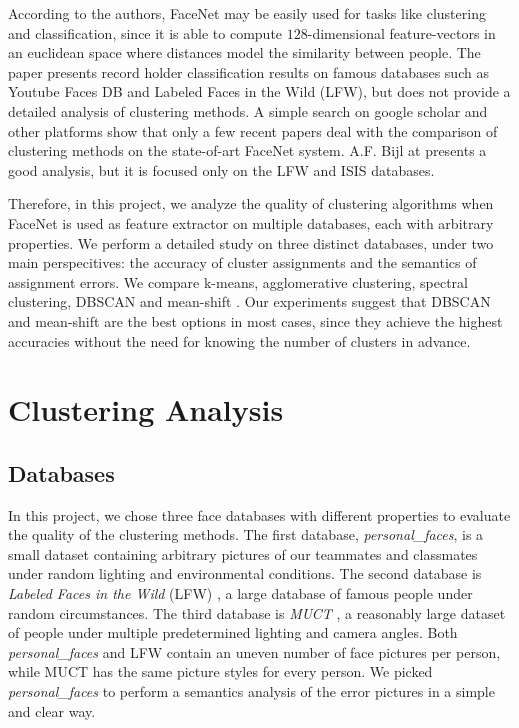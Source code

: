 \documentclass[conference]{IEEEtran}
\begin{document}
According to the authors, FaceNet may be easily used for tasks like clustering and classification, since it is able to compute $128$-dimensional feature-vectors in an euclidean space where distances model the similarity between people.
The paper presents record holder classification results on famous databases such as Youtube Faces DB and Labeled Faces in the Wild (LFW), but
does not provide a detailed analysis of clustering methods.
A simple search on google scholar and other platforms show that only a few recent papers deal with the comparison of clustering methods on the state-of-art FaceNet system.
A.F. Bijl at \cite{b4} presents a good analysis, but it is focused only on the LFW and ISIS databases.

Therefore, in this project, we analyze the quality of clustering algorithms when FaceNet is used as feature extractor on multiple databases, each with arbitrary properties.
We perform a detailed study on three distinct databases, under two main perspecitives: the accuracy of cluster assignments and the semantics of assignment errors.
We compare k-means, agglomerative clustering, spectral clustering, DBSCAN and mean-shift \cite{b2, b3}.
Our experiments suggest that DBSCAN and mean-shift are the best options in most cases, since they achieve the highest accuracies without the need for knowing the number of clusters in advance.

\section{Clustering Analysis}

\subsection{Databases}

In this project, we chose three face databases with different properties to evaluate the quality of the clustering methods.
The first database, \textit{personal\_faces}, is a small dataset containing arbitrary pictures of our teammates and classmates under random lighting and environmental conditions.
The second database is \textit{Labeled Faces in the Wild} (LFW) \cite{b5}, a large database of famous people under random circumstances.
The third database is \textit{MUCT} \cite{b7}, a reasonably large dataset of people under multiple predetermined lighting and camera angles.
Both \textit{personal\_faces} and LFW contain an uneven number of face pictures per person, while MUCT has the same picture styles for every person.
We picked \textit{personal\_faces} to perform a semantics analysis of the error pictures in a simple and clear way.
\end{document}

